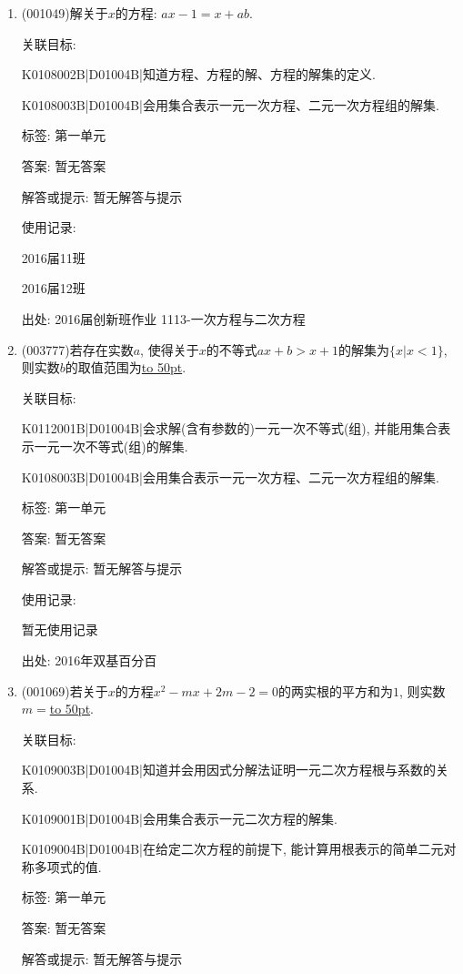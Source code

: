 \documentclass[10pt,a4paper]{article}
\newcommand{\blank}[1]{\underline{\hbox to #1pt{}}}
\begin{document}
\begin{enumerate}[1.]

\item { (001049)}解关于$x$的方程: $ax-1=x+ab$.


关联目标:

K0108002B|D01004B|知道方程、方程的解、方程的解集的定义.

K0108003B|D01004B|会用集合表示一元一次方程、二元一次方程组的解集.



标签: 第一单元

答案: 暂无答案

解答或提示: 暂无解答与提示

使用记录:

2016届11班	

2016届12班	


出处: 2016届创新班作业	1113-一次方程与二次方程
\item { (003777)}若存在实数$a$, 使得关于$x$的不等式$ax+b>x+1$的解集为$\{x|x<1\}$, 则实数$b$的取值范围为\blank{50}.


关联目标:

K0112001B|D01004B|会求解(含有参数的)一元一次不等式(组), 并能用集合表示一元一次不等式(组)的解集.

K0108003B|D01004B|会用集合表示一元一次方程、二元一次方程组的解集.



标签: 第一单元

答案: 暂无答案

解答或提示: 暂无解答与提示

使用记录:

暂无使用记录


出处: 2016年双基百分百
\item { (001069)}若关于$x$的方程$x^2-mx+2m-2=0$的两实根的平方和为$1$, 则实数$m=$\blank{50}.


关联目标:

K0109003B|D01004B|知道并会用因式分解法证明一元二次方程根与系数的关系.

K0109001B|D01004B|会用集合表示一元二次方程的解集.

K0109004B|D01004B|在给定二次方程的前提下, 能计算用根表示的简单二元对称多项式的值.



标签: 第一单元

答案: 暂无答案

解答或提示: 暂无解答与提示


\end{enumerate}
\end{document}
